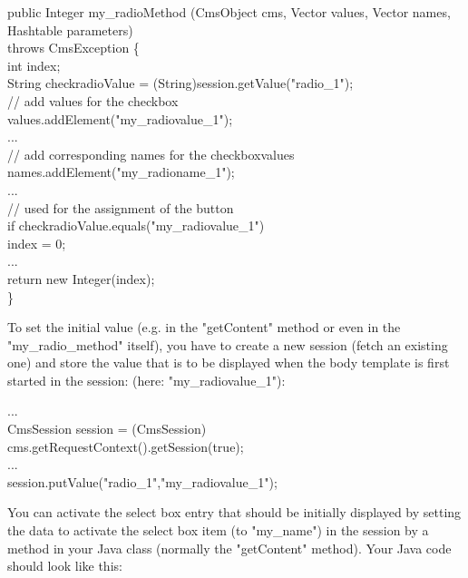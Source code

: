 \begin{java}
public Integer my\_radioMethod (CmsObject cms, Vector values, Vector names, Hashtable parameters)\\
\jtabb                  throws CmsException \{\\
\jtabb                  int index;\\
\jtaba                String checkradioValue = (String)session.getValue("radio\_1");\\
\jtaba                // add values for the checkbox\\
\jtabb                   values.addElement("my\_radiovalue\_1");\\
\jtaba                ...\\
\jtaba                // add corresponding names for the checkboxvalues\\
\jtabb                   names.addElement("my\_radioname\_1");\\
\jtaba                ...\\
\jtaba                // used for the assignment of the button\\
\jtabb                   if checkradioValue.equals("my\_radiovalue\_1")\\
\jtaba                index = 0;\\
\jtaba                ...\\
\jtaba                return new Integer(index);\\
                \}\\
\end{java}

To set the initial value (e.g. in the {\meth "getContent"} method or even in
the {\meth "my\_radio\_method"} itself), you have to create a new session (fetch
an existing one) and store the value that is to be displayed when the
body template is first started in the session:  (here: {\meth "my\_radiovalue\_1")}:

\begin{java}
...\\     
CmsSession session = (CmsSession)\\
cms.getRequestContext().getSession(true);\\
...\\     
session.putValue("radio\_1","my\_radiovalue\_1");\\
\end{java}

You can activate the select box entry that should be initially displayed
by setting the data to activate the select box item {\name (to "my\_name")} in
the session by a method in your Java class (normally the {\meth "getContent"}
method). Your Java code should look like this:

